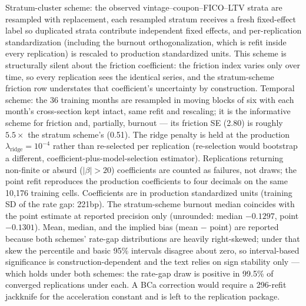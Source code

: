 \documentclass[12pt]{article}
\begin{document}
\begin{table}[t]
\begin{threeparttable}
\begin{tablenotes}[flushleft]
\item Stratum-cluster scheme: the observed vintage--coupon--FICO--LTV strata are resampled with replacement, each resampled stratum receives a fresh fixed-effect label so duplicated strata contribute independent fixed effects, and per-replication standardization (including the burnout orthogonalization, which is refit inside every replication) is rescaled to production standardized units. This scheme is structurally silent about the friction coefficient: the friction index varies only over time, so every replication sees the identical series, and the stratum-scheme friction row understates that coefficient's uncertainty by construction. Temporal scheme: the 36 training months are resampled in moving blocks of six with each month's cross-section kept intact, same refit and rescaling; it is the informative scheme for friction and, partially, burnout --- its friction SE (2.80) is roughly $5.5\times$ the stratum scheme's (0.51). The ridge penalty is held at the production $\lambda_{\mathrm{ridge}} = 10^{-4}$ rather than re-selected per replication (re-selection would bootstrap a different, coefficient-plus-model-selection estimator). Replications returning non-finite or absurd ($|\beta| > 20$) coefficients are counted as failures, not draws; the point refit reproduces the production coefficients to four decimals on the same 10,176 training cells. Coefficients are in production standardized units (training SD of the rate gap: 221bp). The stratum-scheme burnout median coincides with the point estimate at reported precision only (unrounded: median $-0.1297$, point $-0.1301$). Mean, median, and the implied bias (mean $-$ point) are reported because both schemes' rate-gap distributions are heavily right-skewed; under that skew the percentile and basic 95\% intervals disagree about zero, so interval-based significance is construction-dependent and the text relies on sign stability only --- which holds under both schemes: the rate-gap draw is positive in 99.5\% of converged replications under each. A BCa correction would require a 296-refit jackknife for the acceleration constant and is left to the replication package.
\end{tablenotes}
\end{threeparttable}
\end{table}
\end{document}
